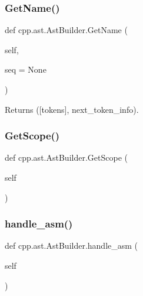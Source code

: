 \mbox{\label{classcpp_1_1ast_1_1_ast_builder_a327957c4228325fc5f64821b047bdc6f}} 
\subsubsection{\texorpdfstring{GetName()}{GetName()}}
{\footnotesize\ttfamily def cpp.\+ast.\+Ast\+Builder.\+Get\+Name (\begin{DoxyParamCaption}\item[{}]{self,  }\item[{}]{seq = {\ttfamily None} }\end{DoxyParamCaption})}

\begin{DoxyVerb}Returns ([tokens], next_token_info).\end{DoxyVerb}
 \mbox{\label{classcpp_1_1ast_1_1_ast_builder_add6826421ce64546a7dbb9b2e699a4d4}} 
\subsubsection{\texorpdfstring{GetScope()}{GetScope()}}
{\footnotesize\ttfamily def cpp.\+ast.\+Ast\+Builder.\+Get\+Scope (\begin{DoxyParamCaption}\item[{}]{self }\end{DoxyParamCaption})}

\mbox{\label{classcpp_1_1ast_1_1_ast_builder_acf6ec42d567cd85a9bad77772c381a4e}} 
\subsubsection{\texorpdfstring{handle\_asm()}{handle\_asm()}}
{\footnotesize\ttfamily def cpp.\+ast.\+Ast\+Builder.\+handle\+\_\+asm (\begin{DoxyParamCaption}\item[{}]{self }\end{DoxyParamCaption})}

